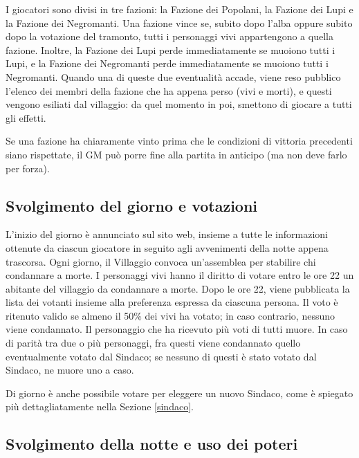 \documentclass[a4paper,10pt]{article}
\begin{document}
I giocatori sono divisi in tre fazioni: la Fazione dei Popolani, la Fazione dei Lupi e la Fazione dei Negromanti.
Una fazione vince se, subito dopo l'alba oppure subito dopo la votazione del tramonto, tutti i personaggi vivi appartengono a quella fazione.
Inoltre, la Fazione dei Lupi perde immediatamente se muoiono tutti i Lupi, e la Fazione dei Negromanti perde immediatamente se muoiono tutti i Negromanti. Quando una di queste due eventualità accade, viene reso pubblico l'elenco dei membri della fazione che ha appena perso (vivi e morti), e questi vengono esiliati dal villaggio: da quel momento in poi, smettono di giocare a tutti gli effetti.

Se una fazione ha chiaramente vinto prima che le condizioni di vittoria precedenti siano rispettate, il GM può porre fine alla partita in anticipo (ma non deve farlo per forza).



\subsection{Svolgimento del giorno e votazioni}

L'inizio del giorno è annunciato sul sito web, insieme a tutte le informazioni ottenute da ciascun giocatore in seguito agli avvenimenti della notte appena trascorsa.
Ogni giorno, il Villaggio convoca un'assemblea per stabilire chi condannare a morte.
I personaggi vivi hanno il diritto di votare entro le ore 22 un abitante del villaggio da condannare a morte. Dopo le ore 22, viene pubblicata la lista dei votanti insieme alla preferenza espressa da ciascuna persona.
Il voto è ritenuto valido se almeno il 50\% dei vivi ha votato; in caso contrario, nessuno viene condannato. Il personaggio che ha ricevuto più voti di tutti muore.
In caso di parità tra due o più personaggi, fra questi viene condannato quello eventualmente votato dal Sindaco; se nessuno di questi è stato votato dal Sindaco, ne muore uno a caso.

Di giorno è anche possibile votare per eleggere un nuovo Sindaco, come è spiegato più dettagliatamente nella Sezione \ref{sindaco}.


\subsection{Svolgimento della notte e uso dei poteri}
\end{document}
